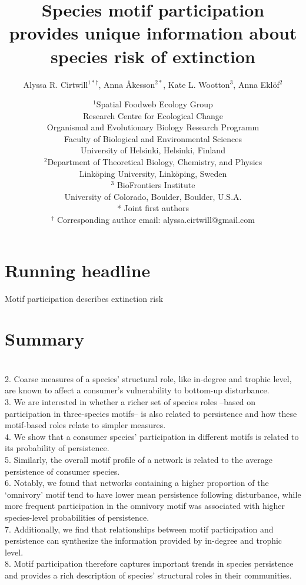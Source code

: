 \documentclass[12pt]{article}
\title{Species motif participation provides unique information about species risk of extinction}
\author{Alyssa R. Cirtwill$^{1*\dagger}$, Anna \r{A}kesson$^{2*}$, Kate L. Wootton$^{3}$, Anna Ekl\"{o}f$^{2}$}
\date{
\small$^1$Spatial Foodweb Ecology Group\\
Research Centre for Ecological Change\\
Organismal and Evolutionary Biology Research Programm\\
Faculty of Biological and Environmental Sciences\\
University of Helsinki, Helsinki, Finland\\
\medskip
\small$^2$Department of Theoretical Biology, Chemistry, and Physics\\ 
Link\"{o}ping University, Link\"{o}ping, Sweden\\
\medskip
\small$^3$ BioFrontiers Institute\\
University of Colorado, Boulder, Boulder, U.S.A.\\
\medskip
* Joint first authors\\
\medskip
$^\dagger$ Corresponding author email: alyssa.cirtwill@gmail.com\\
}
\begin{document}
 
\maketitle 
\raggedright

\setlength{\parindent}{15pt} 

\section*{Running headline}
Motif participation describes extinction risk

\clearpage

\section*{Summary}


     \\
    2. Coarse measures of a species' structural role, like in-degree and trophic level, are known to affect a consumer's vulnerability to bottom-up disturbance. \\
    3. We are interested in whether a richer set of species roles --based on participation in three-species motifs-- is also related to persistence and how these motif-based roles relate to simpler measures. \\
    4. We show that a consumer species' participation in different motifs is related to its probability of persistence. \\ 
    5. Similarly, the overall motif profile of a network is related to the average persistence of consumer species. \\
    6. Notably, we found that networks containing a higher proportion of the `omnivory' motif tend to have lower mean persistence following disturbance, while more frequent participation in the omnivory motif was associated with higher species-level probabilities of persistence. \\
    7. Additionally, we find that relationships between motif participation and persistence can synthesize the information provided by in-degree and trophic level. \\
    8. Motif participation therefore captures important trends in species persistence and provides a rich description of species' structural roles in their communities.
\end{document}
